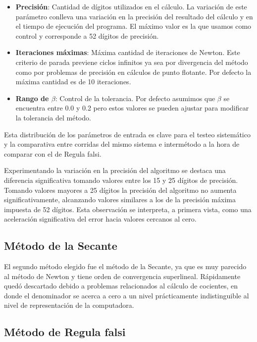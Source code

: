 \begin{itemize}
  \item \textbf{Precisi\'on}: Cantidad de d\'igitos utilizados en el c\'alculo. La variaci\'on de este par\'ametro conlleva una variaci\'on en la precisi\'on del resultado del c\'alculo y en el tiempo de ejecuci\'on del programa. El m\'aximo valor es la que usamos como control y corresponde a 52 d\'igitos de precisi\'on.

  \item \textbf{Iteraciones m\'aximas}: M\'axima cantidad de iteraciones de Newton. Este criterio de parada previene ciclos infinitos ya sea por divergencia del m\'etodo como por problemas de precisi\'on en c\'alculos de punto flotante. Por defecto la m\'axima cantidad es de 10 iteraciones.

  \item \textbf{Rango de $\beta$}: Control de la tolerancia. Por defecto asumimos que $\beta$ se encuentra entre 0.0 y 0.2 pero estos valores se pueden ajustar para modificar la tolerancia del m\'etodo.
\end{itemize}

Esta distribuci\'on de los par\'ametros de entrada es clave para el testeo sistem\'atico y la comparativa entre corridas del mismo sistema e interm\'etodo a la hora de comparar con el de Regula falsi.

Experimentando la variaci\'on en la precisi\'on del algoritmo se destaca una diferencia significativa tomando valores entre los 15 y 25 d\'igitos de precisi\'on. Tomando valores mayores a 25 d\'igitos la precisi\'on del algoritmo no aumenta significativamente, alcanzando valores similares a los de la precisi\'on m\'axima impuesta de 52 d\'igitos. Esta observaci\'on se interpreta, a primera vista, como una aceleraci\'on significativa del error hacia valores cercanos al cero.

\subsection{M\'etodo de la Secante}

El segundo m\'etodo elegido fue el m\'etodo de la Secante, ya que es muy parecido al m\'etodo de Newton y tiene orden de convergencia superlineal. R\'apidamente qued\'o descartado debido a problemas relacionados al c\'alculo de cocientes, en donde el denominador se acerca a cero a un nivel pr\'acticamente indistinguible al nivel de representaci\'on de la computadora.

\subsection{M\'etodo de Regula falsi}

